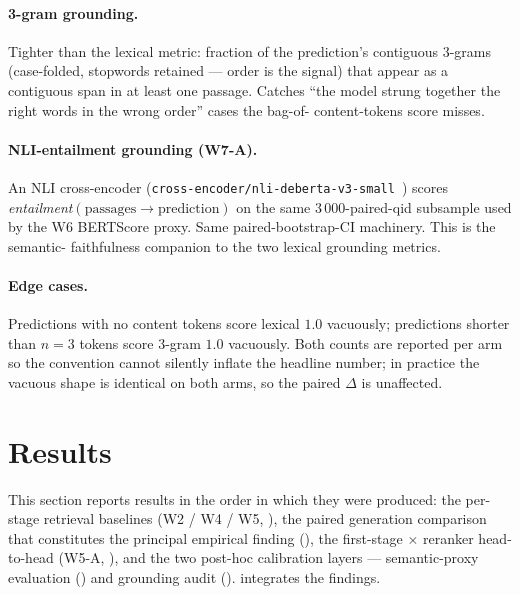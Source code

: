 \documentclass[11pt,a4paper]{article}
\newcommand{\bertscore}{BERTScore}
\begin{document}
\paragraph{3-gram grounding.}  Tighter than the lexical metric:
fraction of the prediction's contiguous 3-grams (case-folded,
stopwords retained --- order is the signal) that appear as a
contiguous span in at least one passage.  Catches ``the model strung
together the right words in the wrong order'' cases the bag-of-
content-tokens score misses.

\paragraph{NLI-entailment grounding (W7-A).}  An NLI cross-encoder
(\texttt{cross-encoder/nli-deberta-v3-small}~\cite{he2023debertav3,williams2018mnli})
scores \emph{entailment}$(\text{passages} \to \text{prediction})$ on
the same 3\,000-paired-qid subsample used by the W6 \bertscore{}
proxy.  Same paired-bootstrap-CI machinery.  This is the semantic-
faithfulness companion to the two lexical grounding metrics.

\paragraph{Edge cases.}  Predictions with no content tokens score
lexical $1.0$ vacuously; predictions shorter than $n\!=\!3$ tokens
score 3-gram $1.0$ vacuously.  Both counts are reported per arm so
the convention cannot silently inflate the headline number; in
practice the vacuous shape is identical on both arms, so the paired
$\Delta$ is unaffected.

\clearpage\section{Results}
\label{sec:results}

This section reports results in the order in which they were
produced: the per-stage retrieval baselines (W2 / W4 / W5,
), the
paired generation comparison that constitutes the principal
empirical finding (), the first-stage
$\times$ reranker head-to-head (W5-A, ), and the
two post-hoc calibration layers --- semantic-proxy evaluation
() and grounding audit ().
 integrates the findings.
\end{document}
